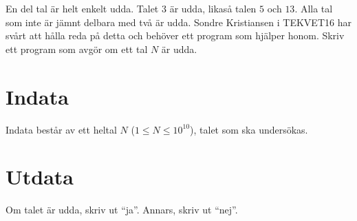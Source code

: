En del tal är helt enkelt udda. Talet $3$ är udda, likaså talen $5$ och $13$. Alla
tal som inte är jämnt delbara med två är udda. Sondre Kristiansen i TEKVET16 har svårt
att hålla reda på detta och behöver ett program som hjälper honom. Skriv ett program
som avgör om ett tal $N$ är udda.

\section*{Indata}
Indata består av ett heltal $N$ ($1 \leq N \leq 10^{10}$), talet som ska undersökas.

\section*{Utdata}
Om talet är udda, skriv ut ``ja''. Annars, skriv ut ``nej''.
